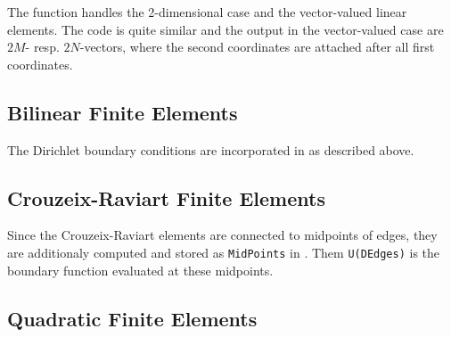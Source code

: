  The function  handles the 2-dimensional case and  the vector-valued linear elements. The code is quite similar and the output in the vector-valued case are $2M$- resp. $2N$-vectors, where the second coordinates are attached after all first coordinates.





\subsection{Bilinear Finite Elements} 

 The Dirichlet boundary conditions are incorporated in  as described above.




\subsection{Crouzeix-Raviart Finite Elements} 

 Since the Crouzeix-Raviart elements are connected to midpoints of edges, they are additionaly computed and stored as {\tt MidPoints} in . Them {\tt U(DEdges)} is the boundary function evaluated at these midpoints. 



\subsection{Quadratic Finite Elements} 


